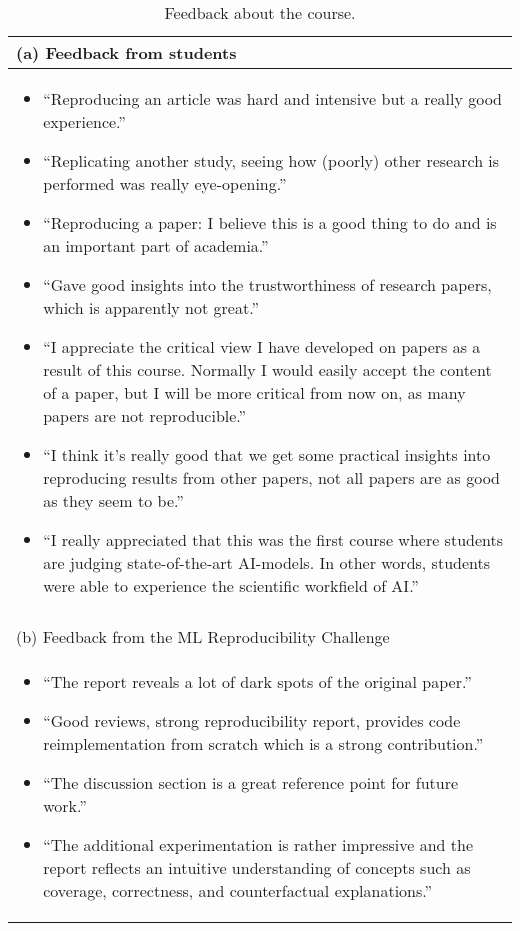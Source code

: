 \begin{table}[h]
\caption{Feedback about the course.}
\centering
\begin{tabular}{@{}l@{}}
\toprule
(a) Feedback from students \\
\midrule
\begin{minipage}[t]{\columnwidth}
\begin{itemize}[leftmargin=*]
    \item ``Reproducing an article was hard and intensive but a really good experience.''
     \item ``Replicating another study, seeing how (poorly) other research is performed was really eye-opening.''
    \item ``Reproducing a paper: I believe this is a good thing to do and is an important part of academia.''
    \item  ``Gave good insights into the trustworthiness of research papers, which is apparently not great.''
    \item ``I appreciate the critical view I have developed on papers as a result of this course. Normally I would easily accept the content of a paper, but I will be more critical from now on, as many papers are not reproducible.''
    \item ``I think it's really good that we get some practical insights into reproducing results from other papers, not all papers are as good as they seem to be.''
    \item ``I really appreciated that this was the first course where students are judging state-of-the-art AI-models. In other words, students were able to experience the scientific workfield of AI.''
\end{itemize}
\end{minipage}
\\ \\
\midrule
(b) Feedback from the ML Reproducibility Challenge \\
\midrule
\begin{minipage}[t]{\columnwidth}
\begin{itemize}[leftmargin=*]
\item ``The report reveals a lot of dark spots of the original paper.''
\item ``Good reviews, strong reproducibility report, provides code reimplementation from scratch which is a strong contribution.''
\item ``The discussion section is a great reference point for future work.''
\item ``The additional experimentation is rather impressive and the report reflects  an intuitive understanding of concepts such as  coverage, correctness, and counterfactual explanations.''

\end{itemize}
\end{minipage}
\end{tabular}
\end{table}
